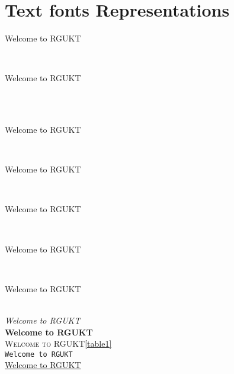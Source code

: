 \documentclass[12pt]{article}
\begin{document}
\section{ Text fonts Representations}
\begin{tiny}
 Welcome to RGUKT
\end{tiny} \\
\newline
\begin{small}
 Welcome to RGUKT
\end{small} \\
\\
\begin{large}
 Welcome to RGUKT
\end{large} \\
\begin{Large}
 Welcome to RGUKT
\end{Large}
\\
\begin{LARGE}
 Welcome to RGUKT
\end{LARGE}
\\
\begin{huge}
 Welcome to RGUKT
\end{huge}
\\
\begin{Huge}
 Welcome to RGUKT
\end{Huge}
\\
\textit{Welcome to RGUKT}
\\
\textbf{Welcome to RGUKT}
\\
\textsc{Welcome to RGUKT}\ref{table1}
\\
\texttt{Welcome to RGUKT}
\\
\underline{Welcome to RGUKT}
\\
{\color{red}{Welcome to RGUKT}}
\\
\end{document}
